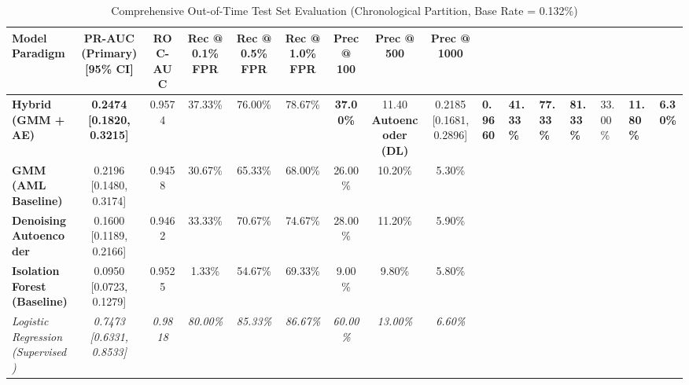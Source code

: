 \documentclass[conference]{IEEEtran}
\begin{document}
\begin{table}[t]
\centering
\caption{Comprehensive Out-of-Time Test Set Evaluation (Chronological Partition, Base Rate = 0.132\%)}
\label{tab:results}
\begin{tabular}{lcccccccc}
\toprule
\textbf{Model Paradigm} & \textbf{PR-AUC (Primary) [95\% CI]} & \textbf{ROC-AUC} & \textbf{Rec @ 0.1\% FPR} & \textbf{Rec @ 0.5\% FPR} & \textbf{Rec @ 1.0\% FPR} & \textbf{Prec @ 100} & \textbf{Prec @ 500} & \textbf{Prec @ 1000} \\
\midrule
\textbf{Hybrid (GMM + AE)} & \textbf{0.2474 [0.1820, 0.3215]} & 0.9574 & 37.33\% & 76.00\% & 78.67\% & \textbf{37.00\%} & 11.40%
\textbf{Autoencoder (DL)} & 0.2185 [0.1681, 0.2896] & \textbf{0.9660} & \textbf{41.33\%} & \textbf{77.33\%} & \textbf{81.33\%} & 33.00\% & \textbf{11.80\%} & \textbf{6.30\%} \\
\textbf{GMM (AML Baseline)} & 0.2196 [0.1480, 0.3174] & 0.9458 & 30.67\% & 65.33\% & 68.00\% & 26.00\% & 10.20\% & 5.30\% \\
\textbf{Denoising Autoencoder} & 0.1600 [0.1189, 0.2166] & 0.9462 & 33.33\% & 70.67\% & 74.67\% & 28.00\% & 11.20\% & 5.90\% \\
\textbf{Isolation Forest (Baseline)} & 0.0950 [0.0723, 0.1279] & 0.9525 & 1.33\% & 54.67\% & 69.33\% & 9.00\% & 9.80\% & 5.80\% \\
\midrule
\textit{Logistic Regression (Supervised)} & \textit{0.7473 [0.6331, 0.8533]} & \textit{0.9818} & \textit{80.00\%} & \textit{85.33\%} & \textit{86.67\%} & \textit{60.00\%} & \textit{13.00\%} & \textit{6.60\%} \\
\bottomrule
\end{tabular}
\end{table}
\end{document}
